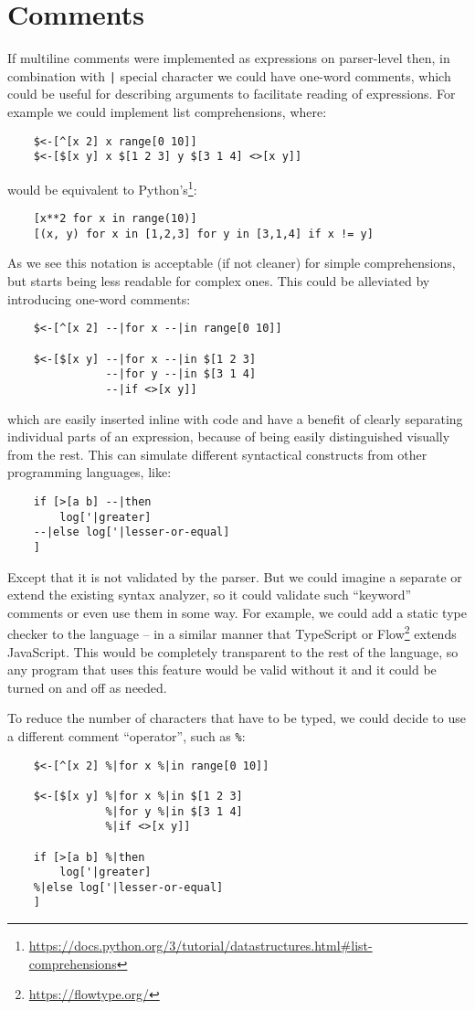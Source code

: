 \section{Comments}\label{sec:comments}
If multiline comments were implemented as expressions on parser-level then, in combination with \texttt{|} special character we could have one-word comments, which could be useful for describing arguments to facilitate reading of expressions. For example we could implement list comprehensions, where:
\begin{lstlisting}
    $<-[^[x 2] x range[0 10]]
    $<-[$[x y] x $[1 2 3] y $[3 1 4] <>[x y]]
\end{lstlisting}
would be equivalent to Python's\footnote{\url{https://docs.python.org/3/tutorial/datastructures.html#list-comprehensions}}:
\begin{lstlisting}
    [x**2 for x in range(10)]
    [(x, y) for x in [1,2,3] for y in [3,1,4] if x != y]
\end{lstlisting}
As we see this notation is acceptable (if not cleaner) for simple comprehensions, but starts being less readable for complex ones. This could be alleviated by introducing one-word comments:
\begin{lstlisting}
    $<-[^[x 2] --|for x --|in range[0 10]]
    
    $<-[$[x y] --|for x --|in $[1 2 3]
               --|for y --|in $[3 1 4]
               --|if <>[x y]]
\end{lstlisting}
which are easily inserted inline with code and have a benefit of clearly separating individual parts of an expression, because of being easily distinguished visually from the rest. This can simulate different syntactical constructs from other programming languages, like:
\begin{lstlisting}
    if [>[a b] --|then
        log['|greater]
    --|else log['|lesser-or-equal]
    ]
\end{lstlisting}
Except that it is not validated by the parser. But we could imagine a separate or extend the existing syntax analyzer, so it could validate such ``keyword'' comments or even use them in some way. For example, we could add a static type checker to the language -- in a similar manner that TypeScript or Flow\footnote{\url{https://flowtype.org/}} extends JavaScript. This would be completely transparent to the rest of the language, so any program that uses this feature would be valid without it and it could be turned on and off as needed.

To reduce the number of characters that have to be typed, we could decide to use a different comment ``operator'', such as \texttt{\%}:
\begin{lstlisting}
    $<-[^[x 2] %|for x %|in range[0 10]]
    
    $<-[$[x y] %|for x %|in $[1 2 3]
               %|for y %|in $[3 1 4]
               %|if <>[x y]]

    if [>[a b] %|then
        log['|greater]
    %|else log['|lesser-or-equal]
    ]
\end{lstlisting}

